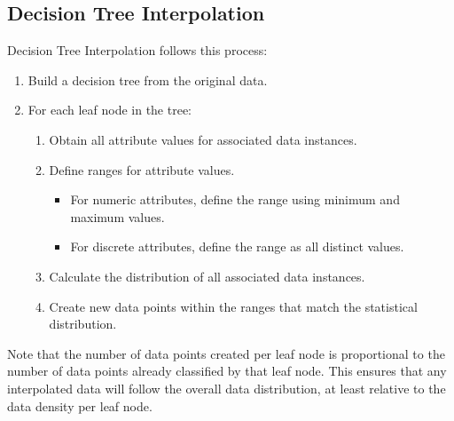 \documentclass{sig-alternate}
\begin{document}
\subsection{Decision Tree Interpolation}
Decision Tree Interpolation follows this process:
\begin{enumerate}
    \item Build a decision tree from the original data.
    \item For each leaf node in the tree:
    \begin{enumerate}
        \item Obtain all attribute values for associated data instances.
        \item Define ranges for attribute values.
        \begin{itemize}
            \item For numeric attributes, define the range using minimum and maximum values.
            \item For discrete attributes, define the range as all distinct values.
        \end{itemize}
        \item Calculate the distribution of all associated data instances.
        \item Create new data points within the ranges that match the statistical distribution.
    \end{enumerate}
\end{enumerate}
Note that the number of data points created per leaf node is proportional to the number of data points already classified by that leaf node. This ensures that any interpolated data will follow the overall data distribution, at least relative to the data density per leaf node. 
\end{document}
